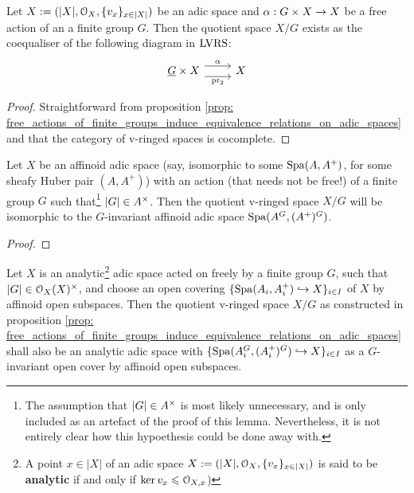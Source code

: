             \begin{corollary} \label{coro: quotients_of_adic_spaces_by_free_actions_of_finite_groups_are_coequalisers}
                Let $X := (|X|, \mathcal{O}_X, \{v_x\}_{x \in |X|})$ be an adic space and $\alpha: G \x X \to X$ be a free action of an a finite group $G$. Then the quotient space $X/G$ exists as the coequaliser of the following diagram in $\mathrm{LVRS}$:
                    $$
                        \begin{tikzcd}
                        	{\underline{G} \x X} & X
                        	\arrow["{\pr_2}"', shift right=2, from=1-1, to=1-2]
                        	\arrow["\alpha", shift left=2, from=1-1, to=1-2]
                        \end{tikzcd}
                    $$
            \end{corollary}
                \begin{proof}
                    Straightforward from proposition \ref{prop: free_actions_of_finite_groups_induce_equivalence_relations_on_adic_spaces} and that the category of v-ringed spaces is cocomplete.
                \end{proof}
            \begin{lemma} \label{lemma: quotients_of_affinoid_adic_spaces_by_finite_groups}
                Let $X$ be an affinoid adic space (say, isomorphic to some $\operatorname{Spa}(A, A^+)$, for some sheafy Huber pair $(A, A^+)$) with an action (that needs not be free!) of a finite group $G$ such that\footnote{The assumption that $|G| \in A^{\x}$ is most likely unnecessary, and is only included as an artefact of the proof of this lemma. Nevertheless, it is not entirely clear how this hypoethesis could be done away with.} $|G| \in A^{\x}$. Then the quotient v-ringed space $X/G$ will be isomorphic to the $G$-invariant affinoid adic space $\operatorname{Spa}(A^G, (A^+)^G)$.
            \end{lemma}
                \begin{proof}
                    
                \end{proof}
            \begin{corollary} \label{coro: quotients_of_adic_spaces_by_free_actions_of_finite_groups}
                Let $X$ is an analytic\footnote{A point $x \in |X|$ of an adic space $X := (|X|, \mathcal{O}_X, \{v_x\}_{x \in |X|})$ is said to be \textbf{analytic} if and only if $\ker v_x \leqslant \mathcal{O}_{X, x}$)} adic space acted on freely by a finite group $G$, such that $|G| \in \calO_X(X)^{\x}$, and choose an open covering $\{\operatorname{Spa}(A_i, A_i^+) \hookrightarrow X\}_{i \in I}$ of $X$ by affinoid open subspaces. Then the quotient v-ringed space $X/G$ as constructed in proposition \ref{prop: free_actions_of_finite_groups_induce_equivalence_relations_on_adic_spaces} shall also be an analytic adic space with $\{\operatorname{Spa}(A_i^G, (A_i^+)^G) \hookrightarrow X\}_{i \in I}$ as a $G$-invariant open cover by affinoid open subspaces.
            \end{corollary}

